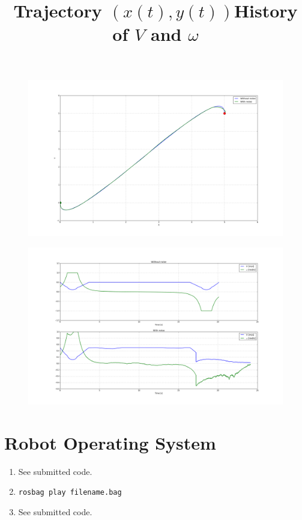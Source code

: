 \documentclass[12pt]{article}
\begin{document}
\begin{enumerate}
	\begin{figure}[H]
		\centering
		\title{\bf Trajectory $(x(t), y(t))$}
		\includegraphics[width=\textwidth]{../Figures/hw1_4_iv_traj.png}
	\end{figure}
	\begin{figure}[H]
		\centering
		\title{\bf History of $V$ and $\omega$}
		\includegraphics[width=\textwidth]{../Figures/hw1_4_iv_ctrl.png}
	\end{figure}
\end{enumerate}

\section{Robot Operating System}
\begin{enumerate}
	\item See submitted code.
	\item \verb|rosbag play filename.bag|
	\item See submitted code.
\end{enumerate}
\end{document}
